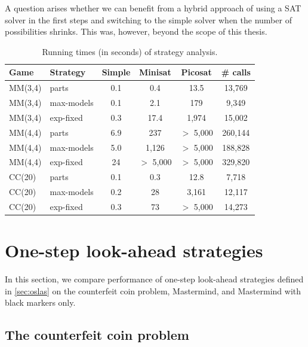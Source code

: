 A question arises whether we can benefit from a hybrid approach of
  using a SAT solver in the first steps and
  switching to the simple solver when the number of possibilities shrinks.
This was, however, beyond the scope of this thesis.

\begin{table}
\begin{center}
\begin{tabular}{|l|l|c|c|c|c|} \hline
Game & Strategy& Simple & Minisat & Picosat & \# calls \\ \hline
MM(3,4) & parts & 0.1 & 0.4 & 13.5 & 13,769 \\
MM(3,4) & max-models & 0.1 & 2.1 & 179 & 9,349 \\
MM(3,4) & exp-fixed & 0.3 & 17.4 & 1,974 & 15,002 \\
MM(4,4) & parts & 6.9 & 237 & $>$ 5,000 & 260,144 \\
MM(4,4) & max-models & 5.0 & 1,126 & $>$ 5,000 & 188,828 \\
MM(4,4) & exp-fixed & 24 & $>$ 5,000 & $>$ 5,000 & 329,820 \\
CC(20) & parts & 0.1 & 0.3 & 12.8 & 7,718 \\
CC(20) & max-models & 0.2 & 28 & 3,161 & 12,117 \\
CC(20) & exp-fixed & 0.3 & 73 & $>$ 5,000 & 14,273 \\\hline
\end{tabular}
\caption{Running times (in seconds) of strategy analysis.}
\label{tbl:exp-sat-analyse}
\end{center}
\end{table}


\section{One-step look-ahead strategies}

In this section, we compare performance of one-step look-ahead strategies
defined in \autoref{sec:oslas} on the counterfeit coin problem,
Mastermind, and Mastermind with black markers only.

\subsection{The counterfeit coin problem}

